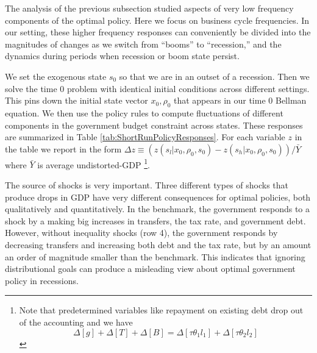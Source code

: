 \documentclass[thmsb,11pt]{article}
\begin{document}
{The analysis of the previous subsection studied  aspects of very low
frequency components of  the optimal policy. Here  we focus on business cycle frequencies.
 In our setting,  these higher frequency responses can conveniently be divided  into the magnitudes of changes as we switch from ``booms''
to ``recession,'' and the dynamics during  periods when recession or boom state persist.

We set the exogenous state
$s_0$ so  that we are in an outset of a recession.  Then we  solve the time 0 problem with identical initial conditions across
different settings. This pins down the initial state vector  $x_0,\rho_0$  that appears in our time $0$ Bellman equation.
We then use the policy rules to compute fluctuations of
different components in the government budget constraint across states. These responses
are summarized in Table \ref{tab:ShortRunPolicyResponses}. For each variable
$z$ in the table we report in the form $\Delta z\equiv \left( z\left(
s_l|x_0,\rho_0,s_0\right) -z\left( s_h|x_0,\rho_0,s_0\right) \right) /\bar{Y}
$ where $\bar{Y}$ is average undistorted-GDP \footnote{%
Note that predetermined variables like repayment on existing debt drop out
of the accounting and we have
\begin{equation*}
\Delta [g]+\Delta[T]+ \Delta [B]=\Delta[\tau \theta_1 l_1]+ \Delta[\tau
\theta_2 l_2]
\end{equation*}%
}.



The source of shocks is very important. Three different types of shocks
that produce drops in GDP  have very different consequences for optimal policies, both qualitatively and
quantitatively. %
In the benchmark, the government responds to a shock by a making big increases in transfers, the  tax rate, and  government debt. However, without inequality shocks (row 4), the government
responds by decreasing transfers and  increasing both debt and
the tax rate, but by an amount an order of magnitude smaller than the benchmark. This  indicates that ignoring distributional goals can produce a misleading view about  optimal government
policy in recessions.



}
\end{document}
